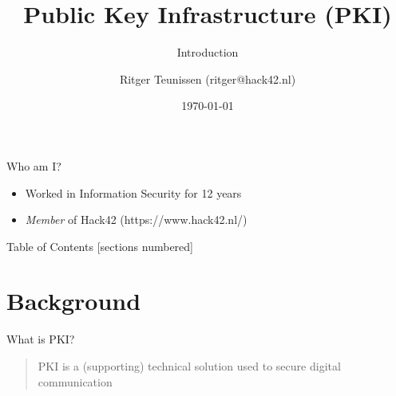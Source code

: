 \documentclass[aspectratio=169]{beamer}
\title{Public Key Infrastructure (PKI)}
\subtitle{Introduction}
\author{Ritger Teunissen (ritger@hack42.nl)}
\institute{Hack42, Arnhem}
\date{\today}
\begin{document}
    \maketitle
    \begin{frame}{Who am I?}
        \begin{itemize}
            \item Worked in Information Security for 12 years
            \item \emph{Member} of \alert{Hack42} (https://www.hack42.nl/)
        \end{itemize}
    \end{frame}

%

    \begin{frame}{Table of Contents}
        [sections numbered]
        \tableofcontents[hideallsubsections]
    \end{frame}

    \section{Background}

    \begin{frame}{What is PKI?}
        \begin{quote}
            \centering
            PKI is a (supporting) technical solution used to secure \alert{digital communication}
        \end{quote}
    \end{frame}
\end{document}
